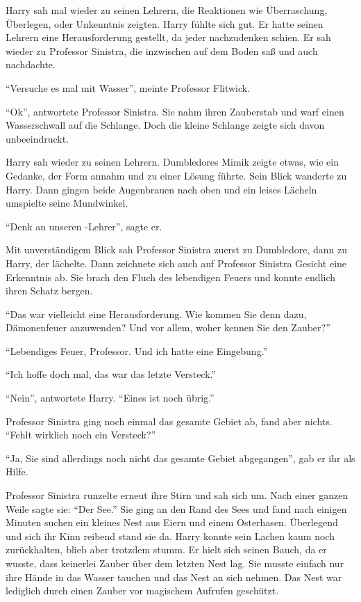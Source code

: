 Harry sah mal wieder zu seinen Lehrern, die Reaktionen wie Überraschung, Überlegen, oder Unkenntnis zeigten. Harry fühlte sich gut. Er hatte seinen Lehrern eine Herausforderung gestellt, da jeder nachzudenken schien. Er sah wieder zu Professor Sinistra, die inzwischen auf dem Boden saß und auch nachdachte.

\enquote{Versuche es mal mit Wasser}, meinte Professor Flitwick.

\enquote{Ok}, antwortete Professor Sinistra. Sie nahm ihren Zauberstab und warf einen Wasserschwall auf die Schlange. Doch die kleine Schlange zeigte sich davon unbeeindruckt.

Harry sah wieder zu seinen Lehrern. Dumbledores Mimik zeigte etwas, wie ein Gedanke, der Form annahm und zu einer Lösung führte. Sein Blick wanderte zu Harry. Dann gingen beide Augenbrauen nach oben und ein leises Lächeln umspielte seine Mundwinkel.

\enquote{Denk an unseren -Lehrer}, sagte er.

Mit unverständigem Blick sah Professor Sinistra zuerst zu Dumbledore, dann zu Harry, der lächelte. Dann zeichnete sich auch auf Professor Sinistra Gesicht eine Erkenntnis ab. Sie brach den Fluch des lebendigen Feuers und konnte endlich ihren Schatz bergen.

\enquote{Das war vielleicht eine Herausforderung. Wie kommen Sie denn dazu, Dämonenfeuer anzuwenden? Und vor allem, woher kennen Sie den Zauber?}

\enquote{Lebendiges Feuer, Professor. Und ich hatte eine Eingebung.}

\enquote{Ich hoffe doch mal, das war das letzte Versteck.}

\enquote{Nein}, antwortete Harry. \enquote{Eines ist noch übrig.}

Professor Sinistra ging noch einmal das gesamte Gebiet ab, fand aber nichts. \enquote{Fehlt wirklich noch ein Versteck?}

\enquote{Ja, Sie sind allerdings noch nicht das gesamte Gebiet abgegangen}, gab er ihr als Hilfe.

Professor Sinistra runzelte erneut ihre Stirn und sah sich um. Nach einer ganzen Weile sagte sie: \enquote{Der See.} Sie ging an den Rand des Sees und fand nach einigen Minuten suchen ein kleines Nest aus Eiern und einem Osterhasen. Überlegend und sich ihr Kinn reibend stand sie da. Harry konnte sein Lachen kaum noch zurückhalten, blieb aber trotzdem stumm. Er hielt sich seinen Bauch, da er wusste, dass keinerlei Zauber über dem letzten Nest lag. Sie musste einfach nur ihre Hände in das Wasser tauchen und das Nest an sich nehmen. Das Nest war lediglich durch einen Zauber vor magischem Aufrufen geschützt.

